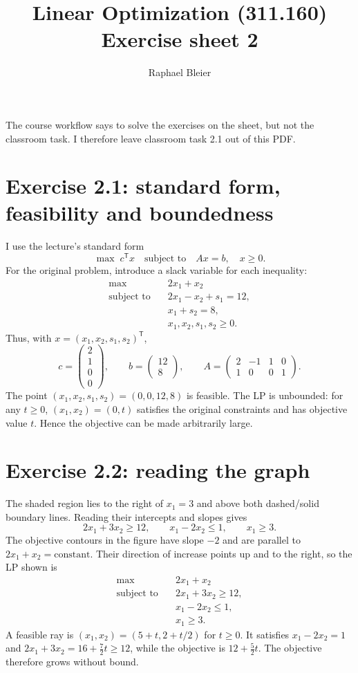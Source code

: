 \documentclass[11pt,a4paper]{article}
\title{Linear Optimization (311.160)\\Exercise sheet 2}
\author{Raphael Bleier}
\date{}
\begin{document}
\maketitle

The course workflow says to solve the exercises on the sheet, but not the classroom task. I therefore leave classroom task 2.1 out of this PDF.

\section*{Exercise 2.1: standard form, feasibility and boundedness}

I use the lecture's standard form
\[
\max\;c^{\mathsf T}x\quad\text{subject to}\quad Ax=b,\quad x\geq0.
\]
For the original problem, introduce a slack variable for each inequality:
\begin{align*}
\max\quad &2x_1+x_2\\
\text{subject to}\quad
&2x_1-x_2+s_1=12,\\
&x_1+s_2=8,\\
&x_1,x_2,s_1,s_2\geq0.
\end{align*}
Thus, with $x=(x_1,x_2,s_1,s_2)^{\mathsf T}$,
\[
 c=\begin{pmatrix}2\\1\\0\\0\end{pmatrix},\qquad
 b=\begin{pmatrix}12\\8\end{pmatrix},\qquad
 A=\begin{pmatrix}2&-1&1&0\\1&0&0&1\end{pmatrix}.
\]
The point $(x_1,x_2,s_1,s_2)=(0,0,12,8)$ is feasible. The LP is unbounded: for any $t\geq0$, $(x_1,x_2)=(0,t)$ satisfies the original constraints and has objective value $t$. Hence the objective can be made arbitrarily large.

\section*{Exercise 2.2: reading the graph}

The shaded region lies to the right of $x_1=3$ and above both dashed/solid boundary lines. Reading their intercepts and slopes gives
\[
2x_1+3x_2\geq12,\qquad x_1-2x_2\leq1,\qquad x_1\geq3.
\]
The objective contours in the figure have slope $-2$ and are parallel to $2x_1+x_2=\text{constant}$. Their direction of increase points up and to the right, so the LP shown is
\begin{align*}
\max\quad &2x_1+x_2\\
\text{subject to}\quad
&2x_1+3x_2\geq12,\\
&x_1-2x_2\leq1,\\
&x_1\geq3.
\end{align*}
A feasible ray is $(x_1,x_2)=(5+t,2+t/2)$ for $t\geq0$. It satisfies $x_1-2x_2=1$ and $2x_1+3x_2=16+\tfrac72t\geq12$, while the objective is $12+\tfrac52t$. The objective therefore grows without bound.
\end{document}

